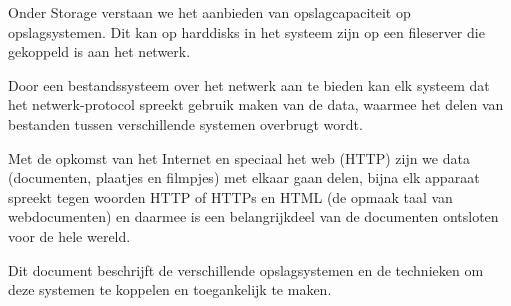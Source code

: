 Onder Storage verstaan we het aanbieden van opslagcapaciteit op opslagsystemen. Dit kan op harddisks in het systeem zijn op een fileserver die gekoppeld is aan het netwerk.

Door een bestandssysteem over het netwerk aan te bieden kan elk systeem dat het netwerk-protocol spreekt gebruik maken van de data, waarmee het delen van bestanden tussen verschillende systemen overbrugt wordt.

Met de opkomst van het Internet en speciaal het web (HTTP) zijn we data (documenten, plaatjes en filmpjes) met elkaar gaan delen, bijna elk apparaat spreekt tegen woorden HTTP of HTTPs en HTML (de opmaak taal van webdocumenten) en daarmee is een belangrijkdeel van de documenten ontsloten voor de hele wereld.

Dit document beschrijft de verschillende opslagsystemen en de technieken om deze systemen te koppelen en toegankelijk te maken.
